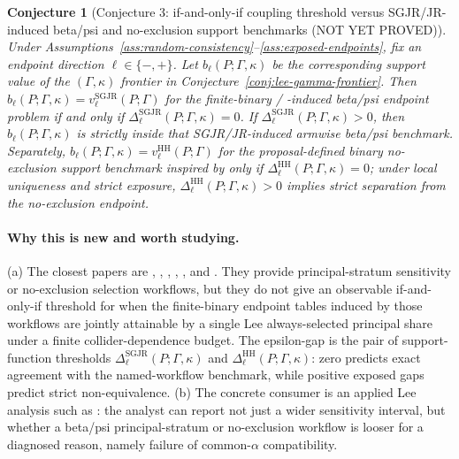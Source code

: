 \documentclass[11pt]{article}
\theoremstyle{definition}
\theoremstyle{plain}
\newtheorem{conjecture}{Conjecture}
\theoremstyle{remark}
\begin{document}
\begin{conjecture}[Conjecture 3: if-and-only-if coupling threshold versus SGJR/JR-induced beta/psi and no-exclusion support benchmarks (NOT YET PROVED)]\label{conj:coupling-iff}
Under Assumptions~\ref{ass:random-consistency}--\ref{ass:exposed-endpoints}, fix an endpoint direction \(\ell\in\{-,+\}\).  Let \(b_\ell(P;\Gamma,\kappa)\) be the corresponding support value of the \((\Gamma,\kappa)\) frontier in Conjecture~\ref{conj:lee-gamma-frontier}.  Then \(b_\ell(P;\Gamma,\kappa)=v_\ell^{\mathrm{SGJR}}(P;\Gamma)\) for the finite-binary \citet{ShepherdGilbertJemiaiRotnitzky2006} / \citet{JemiaiRotnitzkyShepherdGilbert2007}-induced beta/psi endpoint problem if and only if \(\Delta_\ell^{\mathrm{SGJR}}(P;\Gamma,\kappa)=0\).  If \(\Delta_\ell^{\mathrm{SGJR}}(P;\Gamma,\kappa)>0\), then \(b_\ell(P;\Gamma,\kappa)\) is strictly inside that SGJR/JR-induced armwise beta/psi benchmark.  Separately, \(b_\ell(P;\Gamma,\kappa)=v_\ell^{\mathrm{HH}}(P;\Gamma)\) for the proposal-defined binary no-exclusion support benchmark inspired by \citet{HonoreHu2020Selection} only if \(\Delta_\ell^{\mathrm{HH}}(P;\Gamma,\kappa)=0\); under local uniqueness and strict exposure, \(\Delta_\ell^{\mathrm{HH}}(P;\Gamma,\kappa)>0\) implies strict separation from the no-exclusion endpoint.
\end{conjecture}
\paragraph{Why this is new and worth studying.}
(a) The closest papers are \citet{ShepherdGilbertJemiaiRotnitzky2006}, \citet{JemiaiRotnitzkyShepherdGilbert2007}, \citet{ShepherdRedmanAnkerst2008}, \citet{ShepherdGilbertDupont2011}, \citet{EglestonScharfsteinFreemanWest2007}, and \citet{HonoreHu2020Selection}.  They provide principal-stratum sensitivity or no-exclusion selection workflows, but they do not give an observable if-and-only-if threshold for when the finite-binary endpoint tables induced by those workflows are jointly attainable by a single Lee always-selected principal share under a finite collider-dependence budget.  The epsilon-gap is the pair of support-function thresholds \(\Delta_\ell^{\mathrm{SGJR}}(P;\Gamma,\kappa)\) and \(\Delta_\ell^{\mathrm{HH}}(P;\Gamma,\kappa)\): zero predicts exact agreement with the named-workflow benchmark, while positive exposed gaps predict strict non-equivalence.  (b) The concrete consumer is an applied Lee analysis such as \citet{Lee2009SampleSelection}: the analyst can report not just a wider sensitivity interval, but whether a beta/psi principal-stratum or no-exclusion workflow is looser for a diagnosed reason, namely failure of common-\(\alpha\) compatibility.
\end{document}

